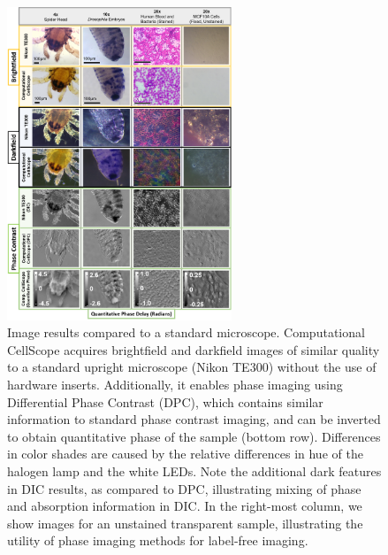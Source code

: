 \begin{figure}
\begin{center}
\includegraphics[width=0.6\textwidth]{figures/fig_ccs_mosaic.png}
\end{center}
\caption {{Image results compared to a standard microscope.} Computational CellScope acquires brightfield and darkfield images of similar quality to a standard upright microscope (Nikon TE300) without the use of hardware inserts. Additionally, it enables phase imaging using Differential Phase Contrast (DPC), which contains similar information to standard phase contrast imaging, and can be inverted to obtain quantitative phase of the sample (bottom row). Differences in color shades are caused by the relative differences in hue of the halogen lamp and the white LEDs. Note the additional dark features in DIC results, as compared to DPC, illustrating mixing of phase and absorption information in DIC. In the right-most column, we show images for an unstained transparent sample, illustrating the utility of phase imaging methods for label-free imaging.
}
\label{fig:fabrication:contrastcomparison}
\end{figure}

